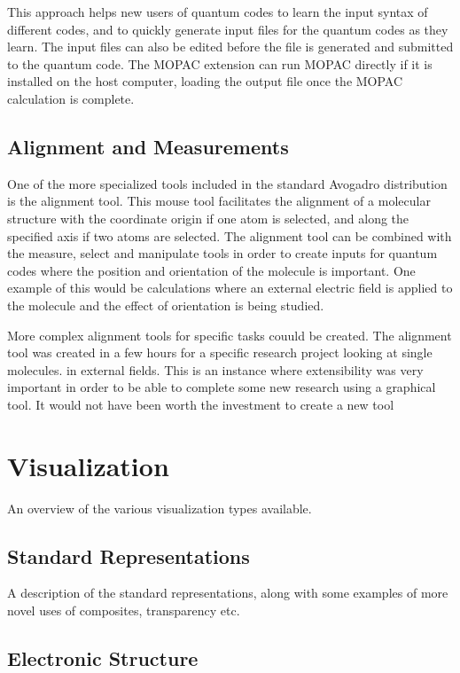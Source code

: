 \documentclass{article}
\begin{document}
This approach helps new users of quantum codes to learn the input syntax of different codes, and to quickly generate input files for the quantum codes as they learn. The input files can also be edited before the file is generated and submitted to the quantum code. The MOPAC extension can run MOPAC directly if it is installed on the host computer, loading the output file once the MOPAC calculation is complete.

\subsection{Alignment and Measurements}

One of the more specialized tools included in the standard Avogadro distribution is the alignment tool. This mouse tool facilitates the alignment of a molecular structure with the coordinate origin if one atom is selected, and along the specified axis if two atoms are selected. The alignment tool can be combined with the measure, select and manipulate tools in order to create inputs for quantum codes where the position and orientation of the molecule is important. One example of this would be calculations where an external electric field is applied to the molecule and the effect of orientation is being studied.

More complex alignment tools for specific tasks couuld be created. The alignment tool was created in a few hours for a specific research project looking at single molecules. in external fields. This is an instance where extensibility was very important in order to be able to complete some new research using a graphical tool. It would not have been worth the investment to create a new tool 


\section{Visualization}

An overview of the various visualization types available.

\subsection{Standard Representations}

A description of the standard representations, along with some examples of more novel uses of composites, transparency etc.

\subsection{Electronic Structure}
\end{document}

